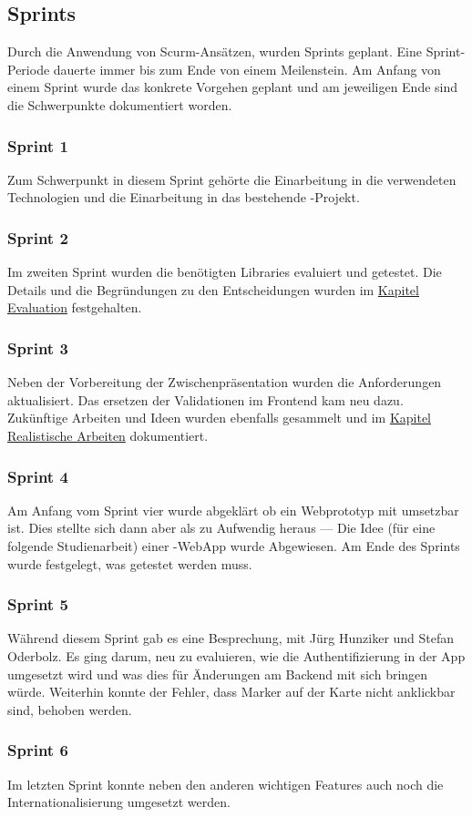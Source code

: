 \subsection{Sprints}
Durch die Anwendung von Scurm-Ansätzen, wurden Sprints geplant. 
Eine Sprint-Periode dauerte immer bis zum Ende von einem Meilenstein. 
Am Anfang von einem Sprint wurde das konkrete Vorgehen geplant und am jeweiligen Ende sind die Schwerpunkte dokumentiert worden.

\subsubsection{Sprint 1}
Zum Schwerpunkt in diesem Sprint gehörte die Einarbeitung in die verwendeten Technologien und die Einarbeitung in das bestehende \kort{}-Projekt.


\subsubsection{Sprint 2}
Im zweiten Sprint wurden die benötigten Libraries evaluiert und getestet.
Die Details und die Begründungen zu den Entscheidungen wurden im \hyperref[tb-evaluation]{Kapitel Evaluation} festgehalten.


\subsubsection{Sprint 3}
Neben der Vorbereitung der Zwischenpräsentation wurden die Anforderungen aktualisiert. 
Das ersetzen der Validationen im Frontend kam neu dazu. 
Zukünftige Arbeiten und Ideen wurden ebenfalls gesammelt und im \hyperref[pd-weiterentwicklung-realistisch]{Kapitel Realistische Arbeiten} dokumentiert.


\subsubsection{Sprint 4}
Am Anfang vom Sprint vier wurde abgeklärt ob ein Webprototyp mit  umsetzbar ist. 
Dies stellte sich dann aber als zu Aufwendig heraus --- Die Idee (für eine folgende Studienarbeit) einer -\gls{WebApp} wurde Abgewiesen.
Am Ende des Sprints wurde festgelegt, was getestet werden muss.

\subsubsection{Sprint 5}
Während diesem Sprint gab es eine Besprechung, mit Jürg Hunziker und Stefan Oderbolz. 
Es ging darum, neu zu evaluieren, wie die Authentifizierung in der App umgesetzt wird und was dies für Änderungen am Backend mit sich bringen würde.
Weiterhin konnte der Fehler, dass Marker auf der Karte nicht anklickbar sind, behoben werden. 

\subsubsection{Sprint 6}
Im letzten Sprint konnte neben den anderen wichtigen Features auch noch die Internationalisierung umgesetzt werden. 


